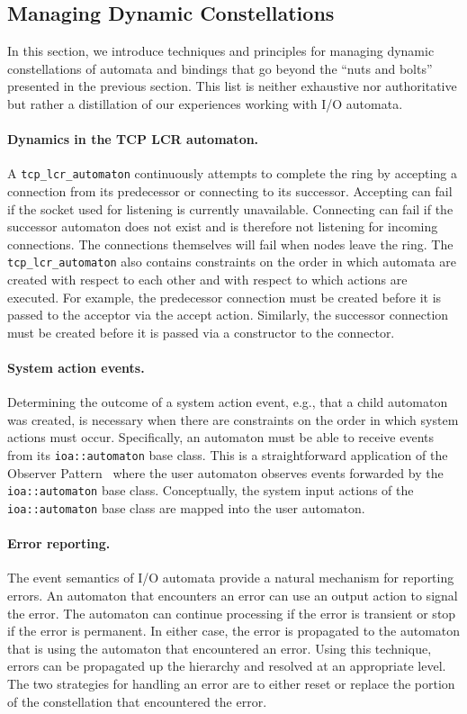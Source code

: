 \subsection{Managing Dynamic Constellations}

In this section, we introduce techniques and principles for managing dynamic constellations of automata and bindings that go beyond the ``nuts and bolts'' presented in the previous section.
This list is neither exhaustive nor authoritative but rather a distillation of our experiences working with I/O automata.

\paragraph{Dynamics in the TCP LCR automaton.}
A \verb+tcp_lcr_automaton+ continuously attempts to complete the ring by accepting a connection from its predecessor or connecting to its successor.
Accepting can fail if the socket used for listening is currently unavailable.
Connecting can fail if the successor automaton does not exist and is therefore not listening for incoming connections.
The connections themselves will fail when nodes leave the ring.
The \verb+tcp_lcr_automaton+ also contains constraints on the order in which automata are created with respect to each other and with respect to which actions are executed.
For example, the predecessor connection must be created before it is passed to the acceptor via the accept action.
Similarly, the successor connection must be created before it is passed via a constructor to the connector.

\paragraph{System action events.}
Determining the outcome of a system action event, e.g., that a child automaton was created, is necessary when there are constraints on the order in which system actions must occur.
Specifically, an automaton must be able to receive events from its \verb+ioa::automaton+ base class.
This is a straightforward application of the Observer Pattern~\cite{} where the user automaton observes events forwarded by the \verb+ioa::automaton+ base class.
Conceptually, the system input actions of the \verb+ioa::automaton+ base class are mapped into the user automaton.

\paragraph{Error reporting.}
The event semantics of I/O automata provide a natural mechanism for reporting errors.
An automaton that encounters an error can use an output action to signal the error.
The automaton can continue processing if the error is transient or stop if the error is permanent.
In either case, the error is propagated to the automaton that is using the automaton that encountered an error.
Using this technique, errors can be propagated up the hierarchy and resolved at an appropriate level.
The two strategies for handling an error are to either reset or replace the portion of the constellation that encountered the error.

